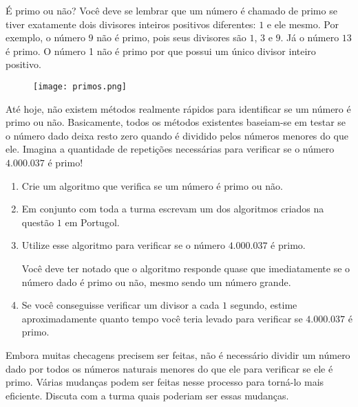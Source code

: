 \begin{task}{É primo ou não?}
Você deve se lembrar que um número é chamado de primo se tiver exatamente dois divisores inteiros positivos diferentes: $1$ e ele mesmo. Por exemplo, o número $9$ não é primo, pois seus divisores são $1$, $3$ e $9$. Já o número $13$ é primo. O número 1 não é primo por que possui um único divisor inteiro positivo.

\begin{figure}[H]
\centering
\texttt{[image: primos.png]}
\end{figure}

Até hoje, não existem métodos realmente rápidos para identificar se um número é primo ou não. Basicamente, todos os métodos existentes baseiam-se em testar se o número dado deixa resto zero quando é dividido pelos números menores do que ele. Imagina a quantidade de repetições necessárias para verificar se o número $4.000.037$ é primo!

\begin{enumerate}
\item Crie um algoritmo que verifica se um número é primo ou não.

\item Em conjunto com toda a turma escrevam um dos algoritmos criados na questão $1$ em Portugol.

\item Utilize esse algoritmo para verificar se o número $4.000.037$ é primo.

Você deve ter notado que o algoritmo responde quase que imediatamente se o número dado é primo ou não, mesmo sendo um número grande.

\item Se você conseguisse verificar um divisor a cada $1$ segundo, estime aproximadamente quanto tempo você teria levado para verificar se $4.000.037$ é primo.
\end{enumerate}

\end{task}

\begin{reflection}
Embora muitas checagens precisem ser feitas, não é necessário dividir um número dado por todos os números naturais menores do que ele para verificar se ele é primo. Várias mudanças podem ser feitas nesse processo para torná-lo mais eficiente. Discuta com a turma quais poderiam ser essas mudanças.
\end{reflection}


